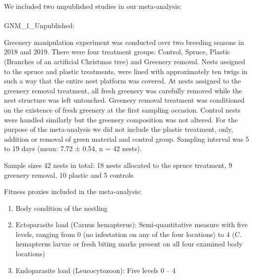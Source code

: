 \documentclass[
  number,
  review,
  onecolumn]{elsarticle}
\makeatletter
\let\oldparagraph\paragraph
\renewcommand{\paragraph}{
    \@ifstar
      \xxxParagraphStar
      \xxxParagraphNoStar
  }
\newcommand{\xxxParagraphStar}[1]{\oldparagraph*{#1}\mbox{}}
\newcommand{\xxxParagraphNoStar}[1]{\oldparagraph{#1}\mbox{}}
\makeatother
\begin{document}
\begin{figsupp}


\caption{\label{figsupp-unpublished-study}}

\end{figsupp}%

We included two unpublished studies in our meta-analysis:

\paragraph{GNM\_1\_Unpublished:}\label{gnm_1_unpublished}

Greenery manipulation experiment was conducted over two breeding seasons
in 2018 and 2019. There were four treatment groups: Control, Spruce,
Plastic (Branches of an artificial Christmas tree) and Greenery removal.
Nests assigned to the spruce and plastic treatments, were lined with
approximately ten twigs in such a way that the entire nest platform was
covered. At nests assigned to the greenery removal treatment, all fresh
greenery was carefully removed while the nest structure was left
untouched. Greenery removal treatment was conditioned on the existence
of fresh greenery at the first sampling occasion. Control nests were
handled similarly but the greenery composition was not altered. For the
purpose of the meta-analysis we did not include the plastic treatment,
only, addition or removal of green material and control group. Sampling
interval was 5 to 19 days (mean: 7.72 ± 0.54, n = 42 nests).

Sample sizes 42 nests in total: 18 nests allocated to the spruce
treatment, 9 greenery removal, 10 plastic and 5 controls

Fitness proxies included in the meta-analysis:

\begin{enumerate}
\def\labelenumi{\arabic{enumi}.}
\item
  Body condition of the nestling
\item
  Ectoparasite load (Carnus hemapterus): Semi-quantitative measure with
  five levels, ranging from 0 (no infestation on any of the four
  locations) to 4 (C. hemapterus larvae or fresh biting marks present on
  all four examined body locations)
\item
  Endoparasite load (Leucocytozoon): Five levels 0 -- 4
\end{enumerate}
\end{document}
